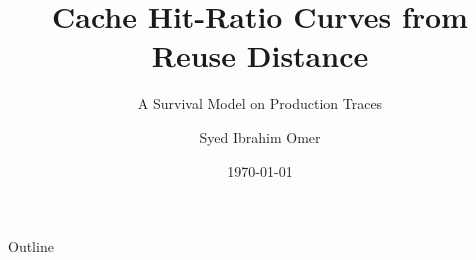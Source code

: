 \documentclass[aspectratio=169,10pt]{beamer}
\title{Cache Hit-Ratio Curves from Reuse Distance}
\subtitle{A Survival Model on Production Traces}
\author{Syed Ibrahim Omer}
\date{\today}
\begin{document}
\maketitle

\begin{frame}{Outline}
  \tableofcontents
\end{frame}









\end{document}
